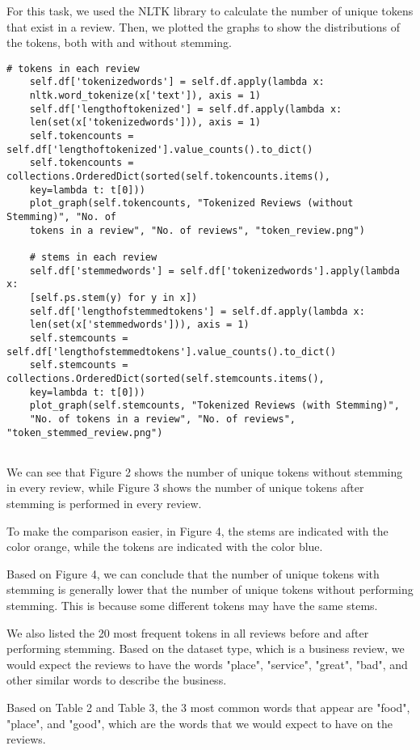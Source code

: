 For this task, we used the NLTK library to calculate the number of unique tokens that exist in a review. Then, we plotted the graphs to show the distributions of the tokens, both with and without stemming.

\begin{Verbatim}[fontsize=\tiny]
    # tokens in each review
    self.df['tokenizedwords'] = self.df.apply(lambda x:
    nltk.word_tokenize(x['text']), axis = 1)
    self.df['lengthoftokenized'] = self.df.apply(lambda x:
    len(set(x['tokenizedwords'])), axis = 1)
    self.tokencounts = self.df['lengthoftokenized'].value_counts().to_dict()
    self.tokencounts = collections.OrderedDict(sorted(self.tokencounts.items(),
    key=lambda t: t[0]))
    plot_graph(self.tokencounts, "Tokenized Reviews (without Stemming)", "No. of
    tokens in a review", "No. of reviews", "token_review.png")

    # stems in each review
    self.df['stemmedwords'] = self.df['tokenizedwords'].apply(lambda x:
    [self.ps.stem(y) for y in x])
    self.df['lengthofstemmedtokens'] = self.df.apply(lambda x:
    len(set(x['stemmedwords'])), axis = 1)
    self.stemcounts = self.df['lengthofstemmedtokens'].value_counts().to_dict()
    self.stemcounts = collections.OrderedDict(sorted(self.stemcounts.items(),
    key=lambda t: t[0]))
    plot_graph(self.stemcounts, "Tokenized Reviews (with Stemming)", 
    "No. of tokens in a review", "No. of reviews", "token_stemmed_review.png")
     
\end{Verbatim}

We can see that Figure 2 shows the number of unique tokens without stemming in every review, while Figure 3 shows the number of unique tokens after stemming is performed in every review.

To make the comparison easier, in Figure 4, the stems are indicated with the color orange, while the tokens are indicated with the color blue.

Based on Figure 4, we can conclude that the number of unique tokens with stemming is generally lower that the number of unique tokens without performing stemming. This is because some different tokens may have the same stems.

We also listed the 20 most frequent tokens in all reviews before and after performing stemming. Based on the dataset type, which is a business review, we would expect the reviews to have the words "place", "service", "great", "bad", and other similar words to describe the business.

Based on Table 2 and Table 3, the 3 most common words that appear are "food", "place", and "good", which are the words that we would expect to have on the reviews.